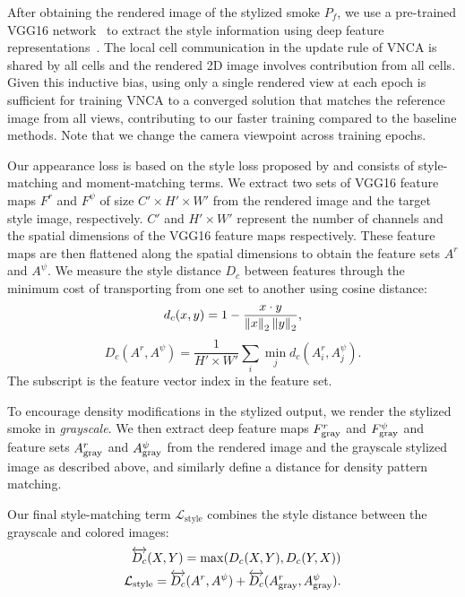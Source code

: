 \medskip
{} 
After obtaining the rendered image of the stylized smoke $P_f$, we use a pre-trained VGG16 network~\cite{vgg16} to extract the style information using deep feature representations~\cite{gatys2016image}. 
The local cell communication in the update rule of VNCA is shared by all cells and the rendered 2D image involves contribution from all cells. 
Given this inductive bias, using only a single rendered view at each epoch is sufficient for training VNCA to a converged solution that matches the reference image from all views,  contributing to our faster training compared to the baseline methods. 
Note that we change the camera viewpoint across training epochs. 

Our appearance loss is based on the style loss proposed by \citet{kolkin2019style} and consists of style-matching and moment-matching terms. 
We extract two sets of VGG16 feature maps $F^r$ and $F^\psi$ of size $C'\times H' \times W'$ from the rendered image and the target style image, respectively. $C'$ and $H' \times W'$ represent the number of channels and the spatial dimensions of the VGG16 feature maps respectively.
These feature maps are then flattened along the spatial dimensions to obtain the feature sets $A^r$ and $A^\psi$.
We measure the style distance $D_c$ between features through the minimum cost of transporting from one set to another using cosine distance:
\begin{equation}
d_{c}(x, y) = 1 - \frac{x \cdot y}{\left\lVert x\right\rVert_2 \left\lVert y\right\rVert_2},
\end{equation}
\begin{equation}
D_c(A^r, A^\psi) = \frac{1}{H' \times W'}\sum_i\min_j d_{c}(A^r_i, A^\psi_j).
\end{equation}
The subscript is the feature vector index in the feature set.

To encourage density modifications in the stylized output, we render the stylized smoke in \textit{grayscale}. 
We then extract deep feature maps $F_{\textup{gray}}^r$ and $F_{\textup{gray}}^\psi$ and feature sets $A_{\textup{gray}}^r$ and $A_{\textup{gray}}^\psi$ from the rendered image and the grayscale stylized image as described above, and similarly define a distance for density pattern matching.  

Our final style-matching term $\mathcal{L}_\text{style}$ combines the style distance between the grayscale and colored images:
\begin{equation}
    \begin{aligned}
        \overleftrightarrow{D_c} (X, Y) = \max(D_c(X, Y), D_c(Y, X)) \\
        \mathcal{L}_\text{style} = \overleftrightarrow{D_c}(A^r, A^\psi)+ \overleftrightarrow{D_c}(A_{\textup{gray}}^r, {A}_{\textup{gray}}^\psi).
    \end{aligned}
\end{equation}


